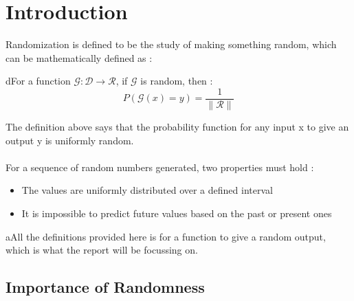 \chapter{Introduction}
Randomization is defined to be the study of making something 
random, which can be mathematically defined as :

\begin{definition}
    dFor a function $\mathcal{G} : \mathcal{D} \rightarrow \mathcal{R}$, 
    if $\mathcal{G}$ is random, then :\\
    \begin{equation*}
        P(\mathcal{G}(x) = y) = \frac{1}{\|\mathcal{R}\|}
    \end{equation*}
\end{definition}

\noindent The definition above says that the probability 
function for any input x to give an output y is uniformly 
random. 
\\\\
For a sequence of random numbers generated, two properties 
must hold :
\begin{itemize}
    \setlength\itemsep{0.01em}
    \item The values are uniformly distributed over a defined interval
    \item It is impossible to predict future values based on the past or present ones
\end{itemize}

\begin{note} 
    aAll the definitions provided here is for a function 
    to give a random output, which is what the report will be 
    focussing on.
\end{note}
\section{Importance of Randomness}
